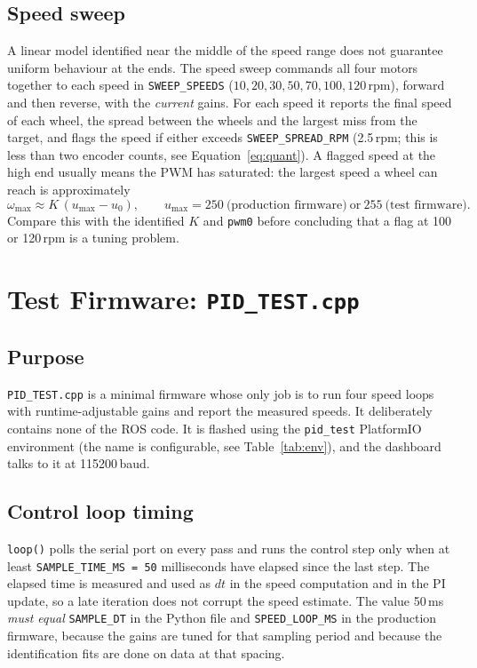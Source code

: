 \documentclass[11pt,a4paper]{report}
\newcommand{\code}[1]{\texttt{#1}}
\newcommand{\rpm}{\,\mathrm{rpm}}
\begin{document}
\section{Speed sweep}\label{sec:sweep}
A linear model identified near the middle of the speed range does not guarantee uniform behaviour at the ends. The speed sweep commands all four motors together to each speed in \code{SWEEP\_SPEEDS} ($10, 20, 30, 50, 70, 100, 120\rpm$), forward and then reverse, with the \emph{current} gains. For each speed it reports the final speed of each wheel, the spread between the wheels and the largest miss from the target, and flags the speed if either exceeds \code{SWEEP\_SPREAD\_RPM} (2.5\,rpm; this is less than two encoder counts, see Equation~\eqref{eq:quant}). A flagged speed at the high end usually means the PWM has saturated: the largest speed a wheel can reach is approximately
\begin{equation}
  \omega_{\max} \approx K\,(u_{\max} - u_0),\qquad u_{\max} = 250\ \text{(production firmware)}\ \text{or}\ 255\ \text{(test firmware)}. \label{eq:wmax}
\end{equation}
Compare this with the identified $K$ and \code{pwm0} before concluding that a flag at 100 or 120\,rpm is a tuning problem.

\chapter[Test Firmware]{Test Firmware: \texttt{PID\_TEST.cpp}}

\section{Purpose}
\code{PID\_TEST.cpp} is a minimal firmware whose only job is to run four speed loops with runtime-adjustable gains and report the measured speeds. It deliberately contains none of the ROS code. It is flashed using the \code{pid\_test} PlatformIO environment (the name is configurable, see Table~\ref{tab:env}), and the dashboard talks to it at 115200\,baud.

\section{Control loop timing}
\code{loop()} polls the serial port on every pass and runs the control step only when at least \code{SAMPLE\_TIME\_MS = 50} milliseconds have elapsed since the last step. The elapsed time is measured and used as $dt$ in the speed computation and in the PI update, so a late iteration does not corrupt the speed estimate. The value 50\,ms \emph{must equal} \code{SAMPLE\_DT} in the Python file and \code{SPEED\_LOOP\_MS} in the production firmware, because the gains are tuned for that sampling period and because the identification fits are done on data at that spacing.
\end{document}
